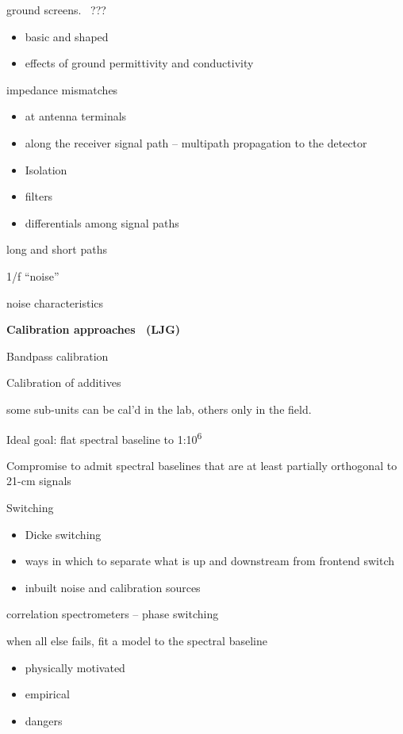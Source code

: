 ground screens.{~ }???

\begin{itemize}
\item
  basic and shaped
\item
  effects of ground permittivity and conductivity
\end{itemize}

impedance mismatches

\begin{itemize}
\item
  at antenna terminals
\item
  along the receiver signal path -- multipath propagation to the
  detector
\item
  Isolation{~}
\item
  filters
\item
  differentials among signal paths
\end{itemize}

long and short paths

1/f ``noise''

noise characteristics

\textbf{Calibration approaches{~ }(LJG)}

Bandpass calibration

Calibration of additives

some sub-units can be cal'd in the lab, others only in the field.

Ideal goal: flat spectral baseline to 1:10\textsuperscript{6}{~}

Compromise to admit spectral baselines that are at least partially
orthogonal to 21-cm signals

Switching

\begin{itemize}
\item
  Dicke switching
\item
  ways in which to separate what is up and downstream from frontend
  switch
\item
  inbuilt noise and calibration sources
\end{itemize}

correlation spectrometers -- phase switching

when all else fails, fit a model to the spectral baseline

\begin{itemize}
\item
  physically motivated
\item
  empirical
\item
  dangers
\end{itemize}

